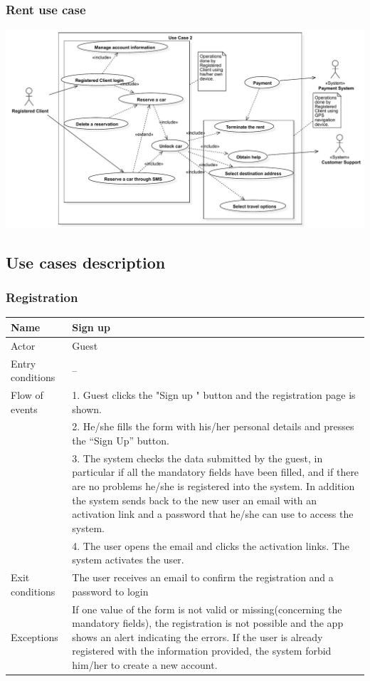 \subsubsection{Rent use case}
\includegraphics[width=\textwidth, keepaspectratio]{../images/diagram/use_cases/rent.pdf}

\clearpage
\subsection{Use cases description}
\subsubsection{Registration}

\begin{table}[!h]
\begin{tabularx}{\linewidth}{l|X}
\centering
Name & Sign up \\ \hline
Actor & Guest \\ \hline
Entry conditions & -- \\ \hline
Flow of events & 1. Guest clicks the "Sign up " button and the registration page is shown. \\
& 2. He/she fills the form with his/her personal details and presses the “Sign Up” button.\\
& 3. The system checks the data submitted by the guest, in particular if all the mandatory fields have been filled, and if there are no problems he/she is registered into the system. In addition the system sends back to the new user an email with an activation link and a password that he/she can use to access the system.\\
& 4. The user opens the email and clicks the activation links. The system activates the user. \\ \hline
Exit conditions & The user receives an email to confirm the registration and a password to login \\ \hline
Exceptions & If one value of the form is not valid or missing(concerning the mandatory fields), the registration is not possible and the app shows an alert indicating the errors. If the user is already registered with the information provided, the system forbid him/her to create a new account. \\
\end{tabularx}
\end{table}

